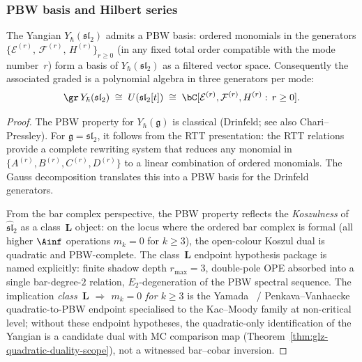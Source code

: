\subsubsection*{PBW basis and Hilbert series}

\begin{theorem}
\label{thm:pbw-sl2}
The Yangian $Y_\hbar(\mathfrak{sl}_2)$ admits a PBW basis:
ordered monomials in the generators
$\{\mathcal{E}^{(r)},\,\mathcal{F}^{(r)},\,H^{(r)}\}_{r\ge 0}$
\textup{(}in any fixed total order compatible with the mode
number~$r$\textup{)} form a basis of
$Y_\hbar(\mathfrak{sl}_2)$ as a filtered vector space. Consequently
the associated graded is a polynomial algebra in three generators per
mode:
\begin{equation}\label{eq:pbw-iso-sl2}
\gr\,Y_\hbar(\mathfrak{sl}_2)
\;\cong\;
U(\mathfrak{sl}_2[t])
\;\cong\;
\bC[\mathcal{E}^{(r)},\mathcal{F}^{(r)},H^{(r)}:\,r\ge 0].
\end{equation}
\end{theorem}

\begin{proof}
The PBW property for $Y_\hbar(\mathfrak g)$ is classical
(Drinfeld; see also Chari--Pressley).
For $\mathfrak g=\mathfrak{sl}_2$, it follows from the RTT
presentation: the RTT relations provide a complete rewriting system
that reduces any monomial in $\{A^{(r)},B^{(r)},C^{(r)},D^{(r)}\}$
to a linear combination of ordered monomials. The Gauss decomposition
translates this into a PBW basis for the Drinfeld generators.

From the bar complex perspective, the PBW property reflects the
\emph{Koszulness} of $\widehat{\mathfrak{sl}}_2$ as a
class~$\mathbf L$ object: on the locus where the ordered bar complex
is formal (all higher $\Ainf$ operations $m_k=0$ for $k\ge 3$), the
open-colour Koszul dual is quadratic and PBW-complete. The
class~$\mathbf L$ endpoint hypothesis package is named explicitly:
finite shadow depth $r_{\max} = 3$, double-pole OPE absorbed into a
single bar-degree-$2$ relation, $E_2$-degeneration of the PBW
spectral sequence. The implication \emph{class~$\mathbf L$
$\Rightarrow$ $m_k = 0$ for $k\ge 3$} is the
Yamada~\cite{Yamada89} / Penkava--Vanhaecke quadratic-to-PBW
endpoint specialised to the Kac--Moody family at non-critical level;
without these endpoint hypotheses, the quadratic-only
identification of the Yangian is a candidate dual with MC comparison
map (Theorem~\ref{thm:glz-quadratic-duality-scope}), not a witnessed
bar--cobar inversion.
\end{proof}


